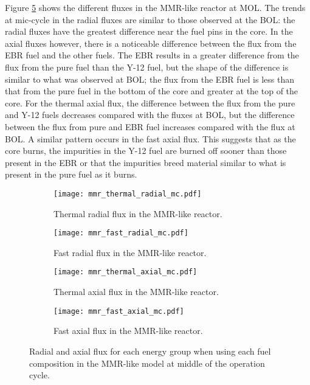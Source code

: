 Figure \ref{fig:mmr_mc} shows the different fluxes in the \gls{MMR}-like 
reactor at \gls{MOL}. The trends at mic-cycle in the radial fluxes are 
similar to those observed at the \gls{BOL}: the radial fluxes have the 
greatest difference near the fuel pins in the core. In the axial fluxes 
however, there is a noticeable difference between the flux from the \gls{EBR} 
fuel and the other fuels. The \gls{EBR} results in a greater difference 
from the flux from the pure fuel than the Y-12 fuel, but the shape of 
the difference is similar to what was observed at \gls{BOL}; the flux from 
the \gls{EBR} fuel is less than that from the pure fuel in the bottom of 
the core and greater at the top of the core. For the thermal axial flux, 
the difference between the flux from the pure and Y-12 fuels decreases 
compared with the fluxes at \gls{BOL}, but the difference between the flux 
from pure and \gls{EBR} fuel increases compared with the flux at \gls{BOL}. 
A similar pattern occurs in the fast axial flux. This suggests that 
as the core burns, the impurities in the Y-12 fuel are burned off sooner 
than those present in the \gls{EBR} or that the impurities breed material 
similar to what is present in the pure fuel as it burns. 

\begin{figure}[h!]
        \centering
        \begin{subfigure}[b]{0.48\textwidth}
            \centering
            \texttt{[image: mmr\_thermal\_radial\_mc.pdf]}
            \caption{Thermal radial flux in the \gls{MMR}-like reactor.}
            \label{fig:mmr_thermal_radial_mc}
        \end{subfigure}
        \hfill
        \begin{subfigure}[b]{0.48\textwidth}
            \centering
            \texttt{[image: mmr\_fast\_radial\_mc.pdf]}
            \caption{Fast radial flux in the \gls{MMR}-like reactor.}
            \label{fig:mmr_fast_radial_mc}
        \end{subfigure}
        \hfill
            
        \begin{subfigure}[b]{0.48\textwidth}
            \centering
            \texttt{[image: mmr\_thermal\_axial\_mc.pdf]}
            \caption{Thermal axial flux in the \gls{MMR}-like reactor. }
            \label{fig:mmr_thermal_axial_mc}
        \end{subfigure}
        \hfill
        \begin{subfigure}[b]{0.48\textwidth}
            \centering
            \texttt{[image: mmr\_fast\_axial\_mc.pdf]}
            \caption{Fast axial flux in the \gls{MMR}-like reactor.}
            \label{fig:mmr_fast_axial_mc}
        \end{subfigure}
        \hfill
        \caption{Radial and axial flux for each energy group when using 
        each fuel composition in the \gls{MMR}-like model at middle of 
        the operation cycle.}
        \label{fig:mmr_mc}
   \end{figure}

